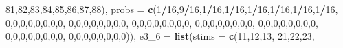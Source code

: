 \documentclass[,man,floatsintext]{apa6}
\newenvironment{Shaded}{\begin{snugshade}}{\end{snugshade}}
\newcommand{\DataTypeTok}[1]{\textcolor[rgb]{0.13,0.29,0.53}{#1}}
\newcommand{\DecValTok}[1]{\textcolor[rgb]{0.00,0.00,0.81}{#1}}
\newcommand{\KeywordTok}[1]{\textcolor[rgb]{0.13,0.29,0.53}{\textbf{#1}}}
\newcommand{\NormalTok}[1]{#1}
\newcommand{\OperatorTok}[1]{\textcolor[rgb]{0.81,0.36,0.00}{\textbf{#1}}}
\begin{document}
\begin{Shaded}
\begin{Highlighting}[]
                         \DecValTok{81}\NormalTok{,}\DecValTok{82}\NormalTok{,}\DecValTok{83}\NormalTok{,}\DecValTok{84}\NormalTok{,}\DecValTok{85}\NormalTok{,}\DecValTok{86}\NormalTok{,}\DecValTok{87}\NormalTok{,}\DecValTok{88}\NormalTok{),}
               \DataTypeTok{probs =} \KeywordTok{c}\NormalTok{(}\DecValTok{1}\OperatorTok{/}\DecValTok{16}\NormalTok{,}\DecValTok{9}\OperatorTok{/}\DecValTok{16}\NormalTok{,}\DecValTok{1}\OperatorTok{/}\DecValTok{16}\NormalTok{,}\DecValTok{1}\OperatorTok{/}\DecValTok{16}\NormalTok{,}\DecValTok{1}\OperatorTok{/}\DecValTok{16}\NormalTok{,}\DecValTok{1}\OperatorTok{/}\DecValTok{16}\NormalTok{,}\DecValTok{1}\OperatorTok{/}\DecValTok{16}\NormalTok{,}\DecValTok{1}\OperatorTok{/}\DecValTok{16}\NormalTok{,}
                         \DecValTok{0}\NormalTok{,}\DecValTok{0}\NormalTok{,}\DecValTok{0}\NormalTok{,}\DecValTok{0}\NormalTok{,}\DecValTok{0}\NormalTok{,}\DecValTok{0}\NormalTok{,}\DecValTok{0}\NormalTok{,}\DecValTok{0}\NormalTok{,}
                         \DecValTok{0}\NormalTok{,}\DecValTok{0}\NormalTok{,}\DecValTok{0}\NormalTok{,}\DecValTok{0}\NormalTok{,}\DecValTok{0}\NormalTok{,}\DecValTok{0}\NormalTok{,}\DecValTok{0}\NormalTok{,}\DecValTok{0}\NormalTok{,}
                         \DecValTok{0}\NormalTok{,}\DecValTok{0}\NormalTok{,}\DecValTok{0}\NormalTok{,}\DecValTok{0}\NormalTok{,}\DecValTok{0}\NormalTok{,}\DecValTok{0}\NormalTok{,}\DecValTok{0}\NormalTok{,}\DecValTok{0}\NormalTok{,}
                         \DecValTok{0}\NormalTok{,}\DecValTok{0}\NormalTok{,}\DecValTok{0}\NormalTok{,}\DecValTok{0}\NormalTok{,}\DecValTok{0}\NormalTok{,}\DecValTok{0}\NormalTok{,}\DecValTok{0}\NormalTok{,}\DecValTok{0}\NormalTok{,}
                         \DecValTok{0}\NormalTok{,}\DecValTok{0}\NormalTok{,}\DecValTok{0}\NormalTok{,}\DecValTok{0}\NormalTok{,}\DecValTok{0}\NormalTok{,}\DecValTok{0}\NormalTok{,}\DecValTok{0}\NormalTok{,}\DecValTok{0}\NormalTok{,}
                         \DecValTok{0}\NormalTok{,}\DecValTok{0}\NormalTok{,}\DecValTok{0}\NormalTok{,}\DecValTok{0}\NormalTok{,}\DecValTok{0}\NormalTok{,}\DecValTok{0}\NormalTok{,}\DecValTok{0}\NormalTok{,}\DecValTok{0}\NormalTok{,}
                         \DecValTok{0}\NormalTok{,}\DecValTok{0}\NormalTok{,}\DecValTok{0}\NormalTok{,}\DecValTok{0}\NormalTok{,}\DecValTok{0}\NormalTok{,}\DecValTok{0}\NormalTok{,}\DecValTok{0}\NormalTok{,}\DecValTok{0}\NormalTok{)),}
  \DataTypeTok{e3_6 =} \KeywordTok{list}\NormalTok{(}\DataTypeTok{stims =} \KeywordTok{c}\NormalTok{(}\DecValTok{11}\NormalTok{,}\DecValTok{12}\NormalTok{,}\DecValTok{13}\NormalTok{,}
                        \DecValTok{21}\NormalTok{,}\DecValTok{22}\NormalTok{,}\DecValTok{23}\NormalTok{,}

\end{Highlighting}
\end{Shaded}
\end{document}
